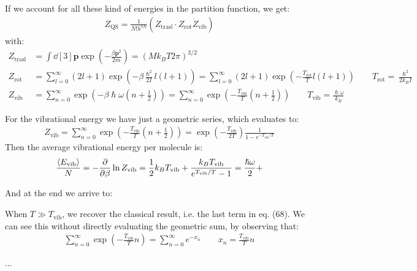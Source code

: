 \documentclass[../template.tex]{subfiles}
\begin{document}
If we account for all these kind of energies in the partition function, we get:
\begin{align*}
    Z_{\mathrm{QS} } = \frac{1}{N! h^{7N}} (Z_{\mathrm{trasl} } \cdot Z_{\mathrm{rot}} \dot Z_{\mathrm{vib}})
\end{align*}
with:
\begin{align*}
    Z_{\mathrm{trasl}} &= \int \dd[3]{\bm{p}} \exp\left(-\frac{\beta \bm{p}^2}{2m} \right) = (M k_B T 2 \pi)^{3/2}\\
    Z_{\mathrm{rot}} &= \sum_{l=0}^{\infty} (2l+1) \exp\left(-\beta \frac{\hslash^2}{2 I} l(l+1) \right) = \sum_{l=0}^\infty (2l+1) \exp\left(-\frac{T_{\mathrm{rot}}}{T} l(l+1) \right) \qquad T_{\mathrm{rot}} = \frac{\hslash^2}{2 k_B I}\\
    Z_{\mathrm{vib}} &= \sum_{n=0}^\infty \exp\left(-\beta \hslash \omega \left(n + \frac{1}{2} \right)\right)  = \sum_{n = 0}^\infty \exp\left(-\frac{T_{\mathrm{vib} }}{T} \left(n + \frac{1}{2} \right) \right) \qquad T_{\mathrm{vib} } = \frac{\hslash \omega}{k_B} 
\end{align*}

For the vibrational energy we have just a geometric series, which evaluates to:
\begin{align*}
    Z_{\mathrm{vib}} = \sum_{n=0}^\infty \exp\left(-\frac{T_{\mathrm{vib} }}{T} \left(n+\frac{1}{2} \right) \right) = \exp\left(-\frac{T_{\mathrm{vib} }}{2 T} \right) \frac{1}{1 - e^{-T_{\mathrm{vib} }/T}} 
\end{align*}
Then the average vibrational energy per molecule is:
\begin{align*}
    \frac{\langle E_{\mathrm{vib} } \rangle}{N} = -\pdv{\beta} \ln Z_{\mathrm{vib} } = \frac{1}{2} k_B T_{\mathrm{vib} } + \frac{k_B T_{\mathrm{vib} }}{e^{T_{\mathrm{vib} }/T} - 1} = \frac{\hslash \omega}{2}   +
\end{align*}

And at the end we arrive to:


\medskip

When $T \gg T_{\mathrm{vib}}$, we recover the classical result, i.e. the last term in eq. (68). We can see this without directly evaluating the geometric sum, by observing that:
\begin{align*}
    \sum_{n=0}^\infty \exp\left(-\frac{T_{\mathrm{vib} }}{T} n \right) = \sum_{n=0}^\infty e^{-x_n} \qquad x_n = \frac{T_{\mathrm{vib} }}{T} n 
\end{align*}

...
\end{document}
